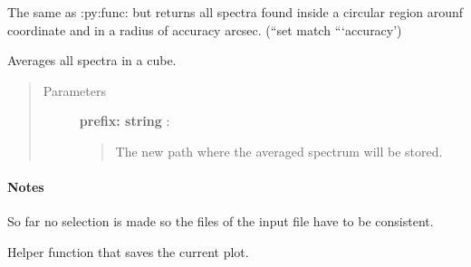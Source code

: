 \documentclass[a4paper,10pt,english]{sphinxmanual}
\begin{document}
\begin{fulllineitems}
\begin{fulllineitems}
\begin{quote}
\begin{description}
\end{description}\end{quote}

\end{fulllineitems}


\begin{fulllineitems}
\label{spectra:astrolyze.spectra.class_.ClassSpectra.get_region_from_cube}
The same as :py:func: but returns all spectra
found inside a circular region arounf coordinate and in a radius of 
accuracy arcsec. (``set match ```accuracy')

\end{fulllineitems}


\begin{fulllineitems}
\label{spectra:astrolyze.spectra.class_.ClassSpectra.get_average_spectrum}
Averages all spectra in a cube.
\begin{quote}\begin{description}
\item[{Parameters }] \leavevmode
\textbf{prefix: string} :
\begin{quote}

The new path where the averaged spectrum will be stored.
\end{quote}

\end{description}\end{quote}
\paragraph{Notes}

So far no selection is made so the files of the input file have to be
consistent.

\end{fulllineitems}


\begin{fulllineitems}
\label{spectra:astrolyze.spectra.class_.ClassSpectra.save_figure}
Helper function that saves the current plot.


\end{fulllineitems}
\end{fulllineitems}
\end{document}
